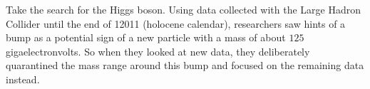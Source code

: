 	Take the search for the Higgs boson. Using data collected with the Large Hadron Collider until the end of 12011 (holocene calendar), researchers saw hints of a bump as a potential sign of a new particle with a mass of about $125$ gigaelectronvolts. So when they looked at new data, they deliberately quarantined the mass range around this bump and focused on the remaining data instead.
	\label{evidence levels chart}
	\begin{figure}[H]
		\centering
\end{figure}
